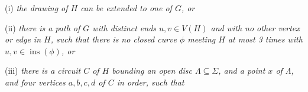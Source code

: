 \hspace*{12pt}(i) \textit{the drawing of $H$ can be extended to one of $G$, or}

\hspace*{12pt}(ii) \textit{there is a path of $G$ with distinct ends $u, v \in V(H)$ and with no other vertex or edge in $H$, such that there is no closed curve $\phi$ meeting $H$ at most 3 times with $u, v \in \operatorname{ins}(\phi)$, or}

\hspace*{12pt}(iii) \textit{there is a circuit $C$ of $H$ bounding an open disc $\Lambda \subseteq \Sigma$, and a point $x$ of $\Lambda$, and four vertices $a, b, c, d$ of $C$ in order, such that}
